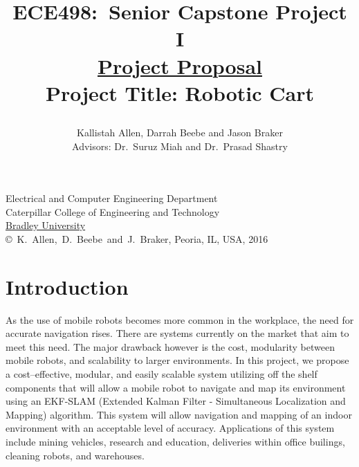 \documentclass[letterpaper,12pt]{article}   %
\title{ECE498:~Senior Capstone Project I\\\textbf{\underline{Project Proposal}}\\
\vspace{0.5in}
Project Title: Robotic Cart
\vspace{1.5in}
\author{Kallistah Allen, Darrah Beebe and Jason Braker\\ Advisors: Dr.~Suruz Miah and Dr.~Prasad Shastry}
}
\date{}  %
\begin{document}
\begin{titlepage}
 \maketitle

\vspace*{4.0cm}
\begin{center}
\normalsize
Electrical and Computer Engineering Department\\
Caterpillar College of Engineering and Technology\\
\href{http://www.bradley.edu/}{Bradley University}\\

\vspace*{6.0cm}
\copyright~K.~Allen,~D.~Beebe~and~J.~Braker, Peoria, IL, USA, 2016\\

\end{center}
\thispagestyle{empty}

\end{titlepage} 
\newpage
\renewcommand{\contentsname}{Table of Contents}
\tableofcontents
\newpage

\section{Introduction} %

As the use of mobile robots becomes more common in the workplace, the need for accurate navigation rises. There are systems currently on the market that aim to meet this need. The major drawback however is the cost, modularity between mobile robots, and scalability to larger environments. In this project, we propose a cost--effective, modular, and easily scalable system utilizing off the shelf components that will allow a mobile robot to navigate and map its environment using an EKF-SLAM (Extended Kalman Filter - Simultaneous Localization and Mapping) algorithm. This system will allow navigation and mapping of an indoor environment with an acceptable level of accuracy. Applications of this system include mining vehicles, research and education, deliveries within office builings, cleaning robots, and warehouses.
\end{document}
